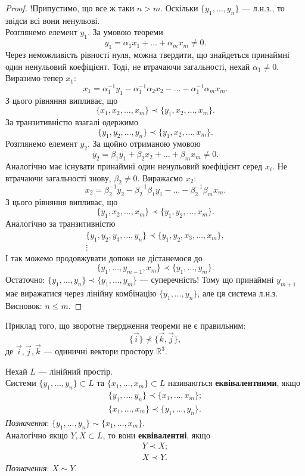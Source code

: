 \documentclass{math_library}
\begin{document}
	\begin{proof}
	!Припустимо, що все ж таки $n > m$. Оскільки $\{y_1,\dots,y_n\}$ --- л.н.з., то звідси всі вони ненульові.\\
Розглянемо елемент $y_1$. За умовою теореми
\[ 
y_1 = \alpha_1 x_1 + \dots + \alpha_m x_m \neq 0.
\]
Через неможливість рівності нуля, можна твердити, що знайдеться принаймні один ненульовий коефіцієнт. Тоді, не втрачаючи загальності, нехай $\alpha_1 \neq 0$. Виразимо тепер $x_1$:
\[
x_1 = \alpha_1^{-1}y_1 - \alpha_1^{-1}\alpha_2 x_2 - \dots - \alpha_1^{-1} \alpha_m x_m.
\]
З цього рівняння випливає, що 
\[
\{x_1, x_2, \dots,x_m\} \prec \{y_1, x_2, \dots,x_m\}.
\]
За транзитивністю взагалі одержимо 
\[
\{y_1,y_2,\dots,y_n \} \prec \{y_1,x_2,\dots,x_m \}.
\]
Розглянемо елемент $y_2$. За щойно отриманою умовою
\[
y_2 = \beta_1 y_1 + \beta_2 x_2 + \dots + \beta_m x_m \neq 0.
\]
Аналогічно має існувати принаймні один ненульовий коефіцієнт серед $x_i$. Не втрачаючи загальності знову, $\beta_2 \neq 0$. Виражаємо $x_2$:
\[
x_2 = \beta_2^{-1}y_2 - \beta_2^{-1}\beta_1 y_1 - \dots - \beta_2^{-1} \beta_m x_m.
\] 
З цього рівняння випливає, що 
\[
\{y_1,x_2,\dots,x_m\} \prec \{y_1,y_2,\dots,x_m\}.
\]
Аналогічно за транзитивністю
\begin{align*}
\{y_1,y_2,y_3,\dots,y_n\} \prec \{y_1,y_2,x_3,\dots,x_m\}, \\
\vdots
\end{align*}
І так можемо продовжувати допоки не дістанемося до 
\[
\{y_1,\dots, y_{m-1}, x_m\} \prec \{y_1,\dots,y_m\}.
\]
Остаточно: $\{y_1,\dots,y_n\} \prec \{y_1,\dots,y_m\}$ --- суперечність! Тому що принаймні $y_{m+1}$ має виражатися через лінійну комбінацію $\{y_1,\dots,y_n\}$, але ця система л.н.з.\\
Висновок: $n \leq m$.
	\end{proof}
	
	\begin{example}
	Приклад того, що зворотне твердження теореми не є правильним:
	\[
	\{\vec{i}\} \not\prec \{\vec{k}, \vec{j}\},
	\]
	де $\vec{i},\vec{j},\vec{k}$ --- одиничні вектори простору $\mathbb{R}^3$.
	\end{example}
	
	\begin{definition}
	Нехай $L$ --- лінійний простір.\\
	Системи $\{y_1, \dots, y_n \} \subset L$ та $\{x_1, \dots, x_m \} \subset L$ називаються \textbf{еквівалентними}, якщо
	\begin{align*}
	\{y_1, \dots, y_n \} \prec \{x_1, \dots, x_m \}; \\
	\{x_1, \dots, x_m \} \prec \{y_1, \dots, y_n \}.
	\end{align*}
	\textit{Позначення}: $\{y_1, \dots, y_n \} \sim \{x_1, \dots, x_m \}$.\\
	Аналогічно якщо $Y,X \subset L$, то вони \textbf{еквівалентні}, якщо
	\begin{align*}
	Y \prec X; \\
	X \prec Y.
	\end{align*}
	\textit{Позначення}: $X \sim Y$.
	\end{definition}
	
\end{document}
